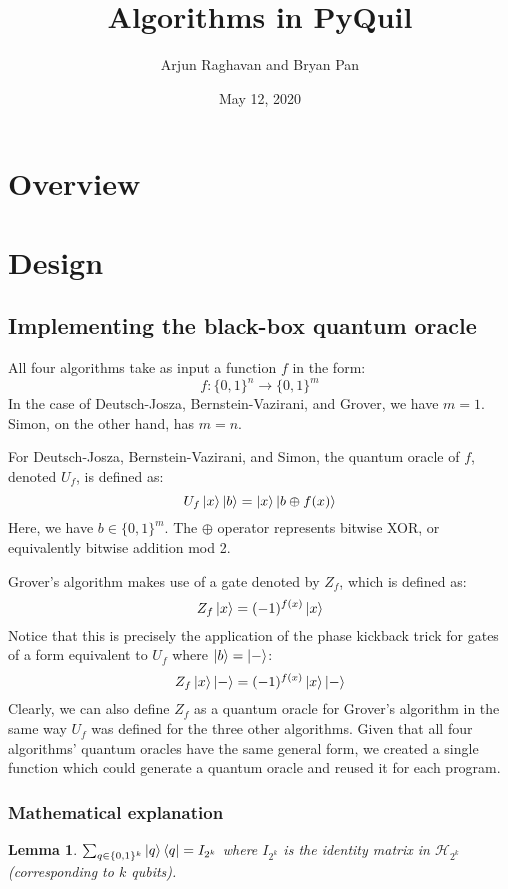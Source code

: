 \documentclass[12pt]{article}
\title{Algorithms in PyQuil}
\author{Arjun Raghavan and Bryan Pan}
\date{May 12, 2020}
\newtheorem{lemma}{Lemma}
\begin{document}
\mktitle
\startbody

\section{Overview}
\section{Design}

\subsection{Implementing the black-box quantum oracle}

All four algorithms take as input a function $f$ in the form:
\[
    f : \{0,1\}^n \to \{0,1\}^m
\]
In the case of Deutsch-Josza, Bernstein-Vazirani, and Grover, we have $m=1$.
Simon, on the other hand, has $m=n$.

For Deutsch-Josza, Bernstein-Vazirani, and Simon, the quantum oracle of $f$, denoted $U_f$, is defined as:
\[
    U_f\ket{x}\ket{b} = \ket{x}\ket{b \oplus f(x)}
\]
Here, we have $b \in \{0,1\}^m$.
The $\oplus$ operator represents bitwise XOR, or equivalently bitwise addition mod 2.

Grover's algorithm makes use of a gate denoted by $Z_f$, which is defined as:
\[
    Z_f\ket{x} = (-1)^{f(x)}\ket{x}
\]
Notice that this is precisely the application of the phase kickback trick for gates of a form equivalent to $U_f$ where $\ket{b} = \ket{-}$:
\[
    Z_f\ket{x}\ket{-} = (-1)^{f(x)}\ket{x}\ket{-}
\]
Clearly, we can also define $Z_f$ as a quantum oracle for Grover's algorithm in the same way $U_f$ was defined for the three other algorithms.
Given that all four algorithms' quantum oracles have the same general form, we created a single function which could generate a quantum oracle and reused it for each program.

\subsubsection{Mathematical explanation}

\begin{lemma}
    $\sum_{q \in \{0,1\}^k}{\ket{q}\bra{q}} = I_{2^k}$ where $I_{2^k}$ is the identity matrix in $\mathcal{H}_{2^k}$ (corresponding to $k$ qubits).
\end{lemma}
\end{document}
